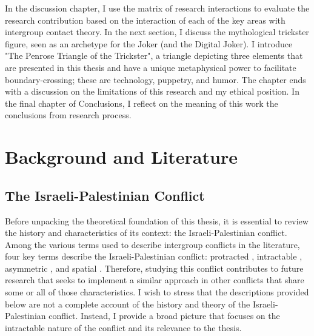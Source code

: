 \documentclass[dissertation,math,vertlayout,pdfa,colorlinks]{aaltoseries}
\begin{document}
In the discussion chapter, I use the matrix of research interactions to evaluate the research contribution based on the interaction of each of the key areas with intergroup contact theory. In the next section, I discuss the mythological trickster figure, seen as an archetype for the Joker (and the Digital Joker). I introduce "The Penrose Triangle of the Trickster", a triangle depicting three elements that are presented in this thesis and have a unique metaphysical power to facilitate boundary-crossing; these are technology, puppetry, and humor. The chapter ends with a discussion on the limitations of this research and my ethical position. In the final chapter of Conclusions, I reflect on the meaning of this work the conclusions from research process.

\chapter{Background and Literature}
\section{The Israeli-Palestinian Conflict}
Before unpacking the theoretical foundation of this thesis, it is essential to review the history and characteristics of its context: the Israeli-Palestinian conflict. Among the various terms used to describe intergroup conflicts in the literature, four key terms describe the Israeli-Palestinian conflict: protracted \cite{azarProtractedSocialConflict1978}, intractable \cite{bar-talIntractableConflictsSociopsychological2013}, asymmetric \cite{ramsbothamRadicalAsymmetryConflict2022}, and spatial \cite{weizmanHollowLandIsraels2012,hassounaSpacesDialogueSegregated2016}. Therefore, studying this conflict contributes to future research that seeks to implement a similar approach in other conflicts that share some or all of those characteristics. I wish to stress that the descriptions provided below are not a complete account of the history and theory of the Israeli-Palestinian conflict. Instead, I provide a broad picture that focuses on the intractable nature of the conflict and its relevance to the thesis. 
\end{document}
